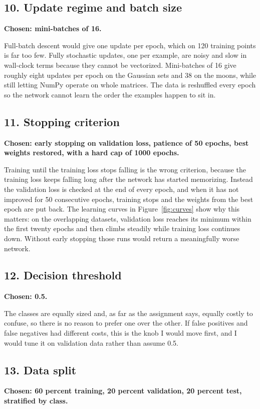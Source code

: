 \documentclass[11pt]{article}
\begin{document}
\subsection*{10. Update regime and batch size}
\textbf{Chosen: mini-batches of 16.}

Full-batch descent would give one update per epoch, which on 120 training points
is far too few. Fully stochastic updates, one per example, are noisy and slow in
wall-clock terms because they cannot be vectorized. Mini-batches of 16 give
roughly eight updates per epoch on the Gaussian sets and 38 on the moons, while
still letting NumPy operate on whole matrices. The data is reshuffled every
epoch so the network cannot learn the order the examples happen to sit in.

\subsection*{11. Stopping criterion}
\textbf{Chosen: early stopping on validation loss, patience of 50 epochs,
best weights restored, with a hard cap of 1000 epochs.}

Training until the training loss stops falling is the wrong criterion, because
the training loss keeps falling long after the network has started memorizing.
Instead the validation loss is checked at the end of every epoch, and when it
has not improved for 50 consecutive epochs, training stops and the weights from
the best epoch are put back. The learning curves in Figure~\ref{fig:curves} show
why this matters: on the overlapping datasets, validation loss reaches its
minimum within the first twenty epochs and then climbs steadily while training
loss continues down. Without early stopping those runs would return a
meaningfully worse network.

\subsection*{12. Decision threshold}
\textbf{Chosen: 0.5.}

The classes are equally sized and, as far as the assignment says, equally
costly to confuse, so there is no reason to prefer one over the other. If false
positives and false negatives had different costs, this is the knob I would
move first, and I would tune it on validation data rather than assume 0.5.

\subsection*{13. Data split}
\textbf{Chosen: 60 percent training, 20 percent validation, 20 percent test,
stratified by class.}
\end{document}
